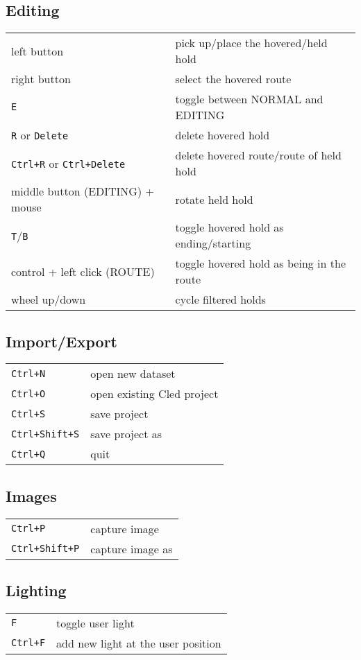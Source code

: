 \subsection{Editing}

\begin{tabular}[]{@{}ll@{}}
\toprule
left button & pick up/place the hovered/held hold \\
right button & select the hovered route \\
\verb|E| & toggle between NORMAL and EDITING \\
\verb|R| or \verb|Delete| & delete hovered hold \\
\verb|Ctrl+R| or \verb|Ctrl+Delete| & delete hovered route/route of held hold \\
middle button (EDITING) + mouse & rotate held hold \\
\verb|T|/\verb|B| & toggle hovered hold as ending/starting \\
control + left click (ROUTE) & toggle hovered hold as being in the
route \\
wheel up/down & cycle filtered holds \\
\bottomrule
\end{tabular}

\subsection{Import/Export}

\begin{tabular}[]{@{}ll@{}}
\toprule
\verb|Ctrl+N| & open new dataset \\
\verb|Ctrl+O| & open existing Cled project \\
\verb|Ctrl+S| & save project \\
\verb|Ctrl+Shift+S| & save project as \\
\verb|Ctrl+Q| & quit \\
\bottomrule
\end{tabular}

\subsection{Images}

\begin{tabular}[]{@{}ll@{}}
\toprule
\verb|Ctrl+P| & capture image \\
\verb|Ctrl+Shift+P| & capture image as \\
\bottomrule
\end{tabular}

\subsection{Lighting}

\begin{tabular}[]{@{}ll@{}}
\toprule
\verb|F| & toggle user light \\
\verb|Ctrl+F| & add new light at the user position \\
\bottomrule
\end{tabular}

